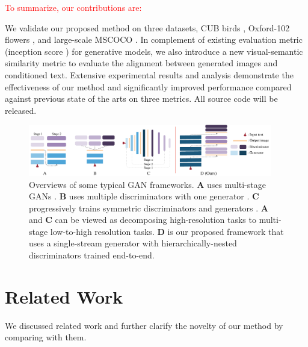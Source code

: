 \documentclass[10pt,twocolumn,letterpaper]{article}
\begin{document}

\textcolor{red}{To summarize, our contributions are:}

We validate our proposed method on three datasets, CUB birds \cite{welinder2010caltech}, Oxford-102 flowers \cite{Nilsback08}, and large-scale MSCOCO \cite{lin2014microsoft}. In complement of existing evaluation metric (inception score \cite{improvedGAN}) for generative models, we also introduce a new visual-semantic similarity metric to evaluate the alignment between generated images and conditioned text. Extensive experimental results and analysis demonstrate the effectiveness of our method and significantly improved performance compared against previous state of the arts on three metrics. All source code will be released.


\begin{figure}[t]
	\centering
	\includegraphics[width=0.95\textwidth]{figure/views2.pdf}
	\vspace{-.2cm}
	\caption{Overviews of some typical GAN frameworks. \textbf{A} uses multi-stage GANs \cite{han2017stackgan,denton2015deep}. \textbf{B} uses multiple discriminators with one generator \cite{durugkar2016generative,tu_etal_nips17_d2gan}. \textbf{C} progressively trains symmetric discriminators and generators \cite{Karras2017progressive,huang2016stacked}. \textbf{A} and \textbf{C} can be viewed as decomposing high-resolution tasks to multi-stage low-to-high resolution tasks.  \textbf{D} is our proposed framework that uses a single-stream generator with hierarchically-nested discriminators trained end-to-end.} \label{fig:archs-review} \vspace{-.4cm}
\end{figure}


\section{Related Work}
We discussed related work and further clarify the novelty of our method by comparing with them.
\end{document}
